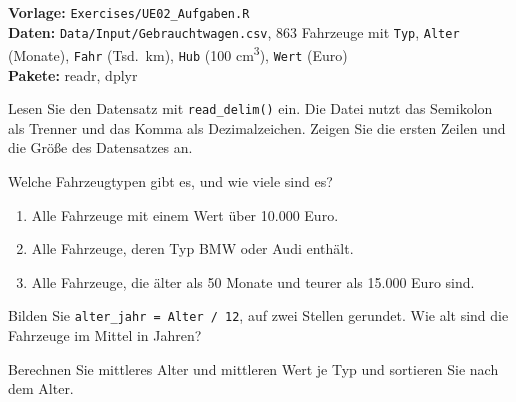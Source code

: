 


\textbf{Vorlage:} \texttt{Exercises/UE02\_Aufgaben.R}\\
\textbf{Daten:} \texttt{Data/Input/Gebrauchtwagen.csv}, 863 Fahrzeuge mit \texttt{Typ}, \texttt{Alter} (Monate), \texttt{Fahr} (Tsd.\ km), \texttt{Hub} (100 cm\textsuperscript{3}), \texttt{Wert} (Euro)\\
\textbf{Pakete:} readr, dplyr

Lesen Sie den Datensatz mit \texttt{read\_delim()} ein. Die Datei nutzt das Semikolon als Trenner und das Komma als Dezimalzeichen. Zeigen Sie die ersten Zeilen und die Größe des Datensatzes an.

Welche Fahrzeugtypen gibt es, und wie viele sind es?

\begin{enumerate}[nosep]
  \item Alle Fahrzeuge mit einem Wert über 10.000 Euro.
  \item Alle Fahrzeuge, deren Typ BMW oder Audi enthält.
  \item Alle Fahrzeuge, die älter als 50 Monate und teurer als 15.000 Euro sind.
\end{enumerate}

Bilden Sie \texttt{alter\_jahr = Alter / 12}, auf zwei Stellen gerundet. Wie alt sind die Fahrzeuge im Mittel in Jahren?

Berechnen Sie mittleres Alter und mittleren Wert je Typ und sortieren Sie nach dem Alter.


